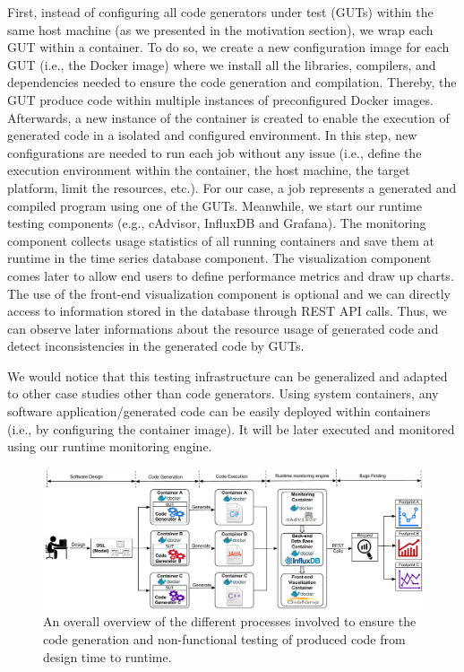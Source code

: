 First, instead of configuring all code generators under test (GUTs) within the same host machine (as we presented in the motivation section), we wrap each GUT within a container. To do so, we create a new configuration image for each GUT (i.e., the Docker image) where we install all the libraries, compilers, and dependencies needed to ensure the code generation and compilation. Thereby, the GUT produce code within multiple instances of preconfigured Docker images. Afterwards, a new instance of the container is created to enable the execution of generated code in a isolated and configured environment. In this step, new configurations are needed to run each job without any issue (i.e., define the execution environment within the container, the host machine, the target platform, limit the resources, etc.). For our case, a job represents a generated and compiled program using one of the GUTs. Meanwhile, we start our runtime testing components (e.g., cAdvisor, InfluxDB and Grafana). The monitoring component collects usage statistics of all running containers and save them at runtime in the time series database component. The visualization component comes later to allow end users to define performance metrics and draw up charts. The use of the front-end visualization component is optional and we can directly access to information stored in the database through REST API calls. Thus, we can observe later informations about the resource usage of generated code and detect inconsistencies in the generated code by GUTs.


\begin{remark}
	We would notice that this testing infrastructure can be generalized and adapted to other case studies other than code generators. Using system containers, any software application/generated code can be easily deployed within containers (i.e., by configuring the container image). It will be later executed and monitored using our runtime monitoring engine. 
\end{remark}


\begin{figure}[h]
	\includegraphics[width=1\linewidth]{Ressources/background2.pdf}
	\caption{An overall overview of the different processes involved to ensure the code generation and non-functional testing of produced code from design time to runtime.}
\end{figure}
